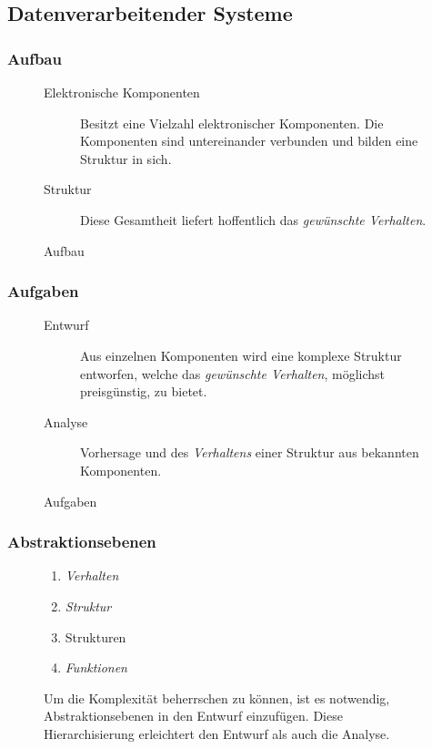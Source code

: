 \documentclass[a4paper]{scrartcl}
\begin{document}
	\subsection{Datenverarbeitender Systeme}
		\subsubsection{Aufbau}
			\begin{figure}[h]
				\begin{description}
					\item [Elektronische Komponenten]
					Besitzt eine Vielzahl elektronischer Komponenten. Die Komponenten sind untereinander verbunden und bilden eine Struktur in sich.
					\item [Struktur] 
					Diese Gesamtheit liefert hoffentlich das \emph{gewünschte Verhalten}.
				\end{description}
			\caption{Aufbau}
			\end{figure}
	\subsubsection{Aufgaben}
		\begin{figure}[h]
			\begin{description}
				\item[Entwurf]
					Aus einzelnen Komponenten wird eine komplexe Struktur entworfen, welche das \emph{gewünschte Verhalten}, möglichst preisgünstig, zu bietet.
				\item[Analyse]
					Vorhersage und des \emph{Verhaltens} einer Struktur aus bekannten Komponenten.
			\end{description}
		\caption{Aufgaben}
		\end{figure}
	
	\subsubsection{Abstraktionsebenen}		
		\begin{figure}[h]
			\begin{enumerate}
				\item \emph{Verhalten} 
				\item \emph{Struktur}
				\item Strukturen
				\item \emph{Funktionen}
			\end{enumerate}
			\caption{Um die Komplexität beherrschen zu können, ist es notwendig, Abstraktionsebenen in den Entwurf einzufügen. Diese Hierarchisierung erleichtert den Entwurf als auch die Analyse.}
		\end{figure}
	
\end{document}
